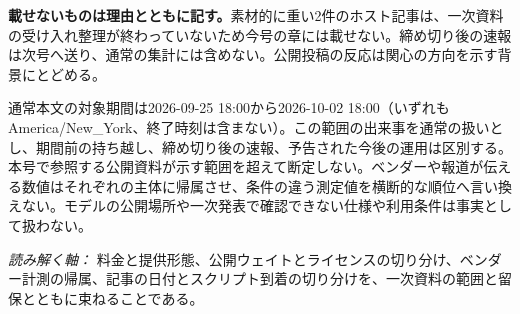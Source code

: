 \begin{tcolorbox}[enhanced,colback=SurveySoft,colframe=SurveyRule,boxrule=0.4pt,arc=1mm,left=3mm,right=3mm,top=2mm,bottom=2mm]
\textbf{載せないものは理由とともに記す。}\quad 素材的に重い2件のホスト記事は、一次資料の受け入れ整理が終わっていないため今号の章には載せない。締め切り後の速報は次号へ送り、通常の集計には含めない。公開投稿の反応は関心の方向を示す背景にとどめる。
\end{tcolorbox}

\vspace{2mm}
\begin{claimboundary}[この号の読み方]
通常本文の対象期間は2026-09-25 18:00から2026-10-02 18:00（いずれもAmerica/New\_York、終了時刻は含まない）。この範囲の出来事を通常の扱いとし、期間前の持ち越し、締め切り後の速報、予告された今後の運用は区別する。本号で参照する公開資料が示す範囲を超えて断定しない。ベンダーや報道が伝える数値はそれぞれの主体に帰属させ、条件の違う測定値を横断的な順位へ言い換えない。モデルの公開場所や一次発表で確認できない仕様や利用条件は事実として扱わない。
\end{claimboundary}

\vspace{2mm}
\noindent\textit{読み解く軸：} 料金と提供形態、公開ウェイトとライセンスの切り分け、ベンダー計測の帰属、記事の日付とスクリプト到着の切り分けを、一次資料の範囲と留保とともに束ねることである。
